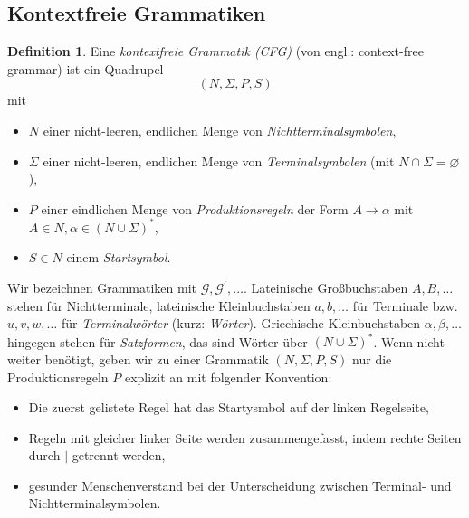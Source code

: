 \documentclass[11pt, a4paper]{article}
\theoremstyle{definition}
\newtheorem{definition}{Definition}[section]
\theoremstyle{plain}
\numberwithin{equation}{section}
\let\emptyset\varnothing
\begin{document}
\subsection{Kontextfreie Grammatiken}\label{sec:contextfree_grammars}
\begin{definition}
	Eine \textit{kontextfreie Grammatik (CFG)} (von engl.: context-free grammar) ist ein Quadrupel
	$$
		(N, \Sigma, P, S)
	$$
	mit
	\begin{itemize}
		\item $N$ einer nicht-leeren, endlichen Menge von \textit{Nichtterminalsymbolen},
		\item $\Sigma$ einer nicht-leeren, endlichen Menge von \textit{Terminalsymbolen} (mit $N \cap \Sigma = \emptyset$),
		\item $P$ einer eindlichen Menge von \textit{Produktionsregeln} der Form $A \to \alpha$ mit $A \in N, \alpha \in (N \cup \Sigma)^\ast$,
		\item $S \in N$ einem \textit{Startsymbol}.
	\end{itemize}
\end{definition}
Wir bezeichnen Grammatiken mit $\mathcal{G}, \mathcal{G}^\prime, \ldots$. Lateinische Großbuchstaben $A, B, \ldots$ stehen für Nichtterminale, lateinische Kleinbuchstaben $a, b, \ldots$ für Terminale bzw. $u, v, w, \ldots$ für \textit{Terminalwörter} (kurz: \textit{Wörter}). Griechische Kleinbuchstaben $\alpha, \beta, \ldots$ hingegen stehen für \textit{Satzformen}, das sind Wörter über $(N \cup \Sigma)^\ast$. Wenn nicht weiter benötigt, geben wir zu einer Grammatik $(N, \Sigma, P, S)$ nur die Produktionsregeln $P$ explizit an mit folgender Konvention:
\begin{itemize}
	\item Die zuerst gelistete Regel hat das Startysmbol auf der linken Regelseite,
	\item Regeln mit gleicher linker Seite werden zusammengefasst, indem rechte Seiten durch $|$ getrennt werden,
	\item gesunder Menschenverstand bei der Unterscheidung zwischen Terminal- und Nichtterminalsymbolen.
\end{itemize}
\end{document}
